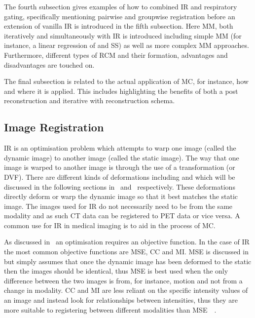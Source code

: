         The fourth subsection gives examples of how to combined \gls{IR} and respiratory gating, specifically mentioning pairwise and groupwise registration before an extension of vanilla \gls{IR} is introduced in the fifth subsection. Here \gls{MM}, both iteratively and simultaneously with \gls{IR} is introduced including simple \gls{MM} (for instance, a linear regression of  and \gls{SS}) as well as more complex \gls{MM} approaches. Furthermore, different types of \gls{RCM} and their formation, advantages and disadvantages are touched on.
        
        The final subsection is related to the actual application of \gls{MC}, for instance, how and where it is applied. This includes highlighting the benefits of both a post reconstruction and iterative with reconstruction schema.
    
        \subsection{Image Registration} \label{sec:image_registration}
            \gls{IR} is an optimisation problem which attempts to warp one image (called the dynamic image) to another image (called the static image). The way that one image is warped to another image is through the use of a transformation (or \gls{DVF}). There are  different kinds of deformations including  and  which will be discussed in the following sections in~ and~ respectively. These deformations directly deform or warp the dynamic image so that it best matches the static image. %
            The images used for \gls{IR} do not necessarily need to be from the same modality and as such \gls{CT} data can be registered to \gls{PET} data or vice versa. A common use for \gls{IR} in medical imaging is to aid in the process of \gls{MC}.
            
            As discussed in~ an optimisation requires an objective function. In the case of \gls{IR} the most common objective functions are \gls{MSE}, \gls{CC} and \gls{MI}. \gls{MSE} is discussed in~ but simply assumes that once the dynamic image has been deformed to the static then the images should be identical, thus \gls{MSE} is best used when the only difference between the two images is from, for instance, motion and not from a change in modality. \gls{CC} and \gls{MI} are less reliant on the specific intensity values of an image and instead look for relationships between intensities, thus they are more suitable to registering between different modalities than \gls{MSE}~~.
            
